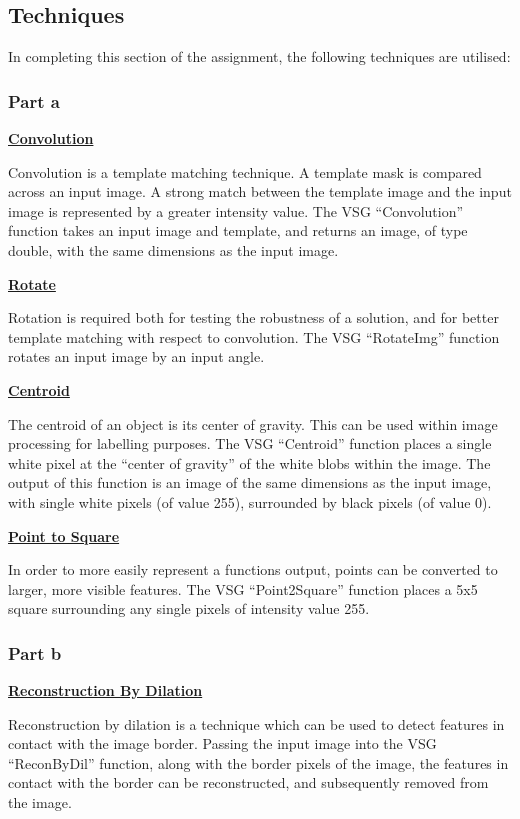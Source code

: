 \documentclass[a4paper]{article}
\begin{document}
	\subsection{Techniques}
	In completing this section of the assignment, the following techniques
	are utilised:
	\subsubsection{Part a}
	\underline{\textbf{Convolution}}
	\par Convolution is a template matching technique. A template mask is
	compared across an input image. A strong match between the template
	image and the input image is represented by a greater intensity value.
	The VSG ``Convolution'' function takes an input image and template, and
	returns an image, of type double, with the same dimensions as the input
	image.
	\par\underline{\textbf{Rotate}}
	\par Rotation is required both for testing the robustness of a solution, and
	for better template matching with respect to convolution. The VSG
	``RotateImg'' function rotates an input image by an input angle.
	\par\underline{\textbf{Centroid}}
	\par The centroid of an object is its center of gravity. This can be used
	within image processing for labelling purposes. The VSG ``Centroid''
	function places a single white pixel at the ``center of gravity'' of the
	white blobs within the image. The output of this function is an image of
	the same dimensions as the input image, with single white pixels (of
	value 255), surrounded by black pixels (of value 0).
	\par\underline{\textbf{Point to Square}}
	\par In order to more easily represent a functions output, points can be
	converted to larger, more visible features. The VSG ``Point2Square''
	function places a 5x5 square surrounding any single pixels of intensity
	value 255.
	\subsubsection{Part b}
	\underline{\textbf{Reconstruction By Dilation}}
	\par Reconstruction by dilation is a technique which can be used to
	detect features in contact with the image border. Passing the input
	image into the VSG ``ReconByDil'' function, along with the border pixels
	of the image, the features in contact with the border can be
	reconstructed, and subsequently removed from the image.
\end{document}
